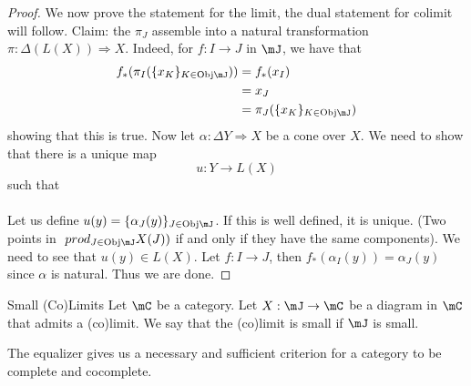 \documentclass[a4paper]{article}
\begin{document}
\begin{prp}{}{}
\begin{proof}
We now prove the statement for the limit, the dual statement for colimit will follow. Claim: the $\pi_J$ assemble into a natural transformation $\pi:\Delta(L(X))\Rightarrow X$. Indeed, for $f:I\to J$ in $\mJ$, we have that 
\begin{align*}
f_\ast(\pi_I(\{x_K\}_{K\in\text{Obj}\mJ}))&=f_\ast(x_I)\\
&=x_J\\
&=\pi_J(\{x_K\}_{K\in\text{Obj}\mJ})
\end{align*}
showing that this is true. Now let $\alpha:\Delta Y\Rightarrow X$ be a cone over $X$. We need to show that there is a unique map $$u:Y\to L(X)$$ such that \\
\\
Let us define $u(y)=\{\alpha_J(y)\}_{J\in\text{Obj}\mJ}$. If this is well defined, it is unique. (Two points in $\ prod_{J\in\text{Obj}\mJ}X(J))$ if and only if they have the same components). We need to see that $u(y)\in L(X)$. Let $f:I\to J$, then $f_\ast(\alpha_I(y))=\alpha_J(y)$ since $\alpha$ is natural. Thus we are done. 
\end{proof}
\end{prp}

\begin{defn}{Small (Co)Limits}{} Let $\mC$ be a category. Let $X:\mJ\to\mC$ be a diagram in $\mC$ that admits a (co)limit. We say that the (co)limit is small if $\mJ$ is small. 
\end{defn}

The equalizer gives us a necessary and sufficient criterion for a category to be complete and cocomplete. 
\end{document}
